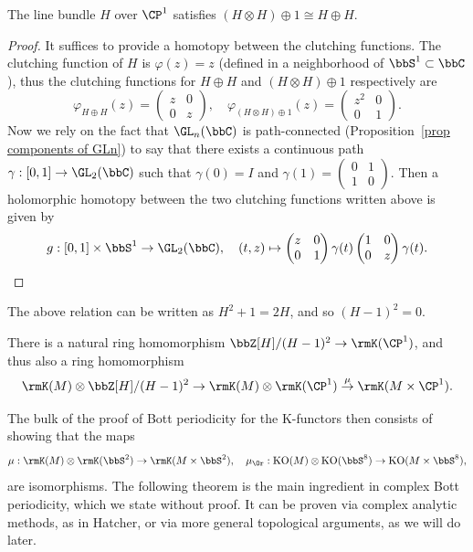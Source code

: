 \begin{prop}
    The line bundle $H$ over $\CP^1$ satisfies $(H\otimes H)\oplus 1\cong H\oplus H$.
\end{prop}
\begin{proof}
    It suffices to provide a homotopy between the clutching functions. The clutching function of $H$ is $\varphi(z)=z$ (defined in a neighborhood of $\bbS^1\subset \bbC$), thus the clutching functions for $H\oplus H$  and $(H\otimes H)\oplus 1$ respectively are
    \[\varphi_{H\oplus H}(z)=\begin{pmatrix}
        z&0\\0&z
    \end{pmatrix},\quad \varphi_{(H\otimes H)\oplus 1}(z)=\begin{pmatrix}
        z^2&0\\0&1
    \end{pmatrix}.\]
    Now we rely on the fact that $\GL_n(\bbC)$ is path-connected (Proposition~\ref{prop components of GLn}) to say that there exists a continuous path $\gamma:[0,1]\to \GL_2(\bbC)$ such that $\gamma(0)=I$ and $\gamma(1)=\begin{pmatrix}
        0&1\\1&0
    \end{pmatrix}.$
    Then a holomorphic homotopy between the two clutching functions written above is given by
    \[g:[0,1]\times\bbS^1\to \GL_2(\bbC),\quad (t,z)\mapsto \begin{pmatrix}
        z&0\\0&1
    \end{pmatrix}\gamma(t)
    \begin{pmatrix}
        1&0\\0&z
    \end{pmatrix}\gamma(t).\]
\end{proof}
The above relation can be written as $H^2+1=2H$, and so $(H-1)^2=0$.
\begin{cor}
    There is a natural ring homomorphism $\bbZ[H]\slash (H-1)^2\to \rmK(\CP^1)$, and thus also a ring homomorphism
    \[\rmK(M)\otimes \bbZ[H]\slash (H-1)^2\to \rmK(M)\otimes \rmK(\CP^1)\overset{\mu}{\to}\rmK(M\times \CP^1).\]
\end{cor}

The bulk of the proof of Bott periodicity for the K-functors then consists of showing that the maps 
\[\mu:\rmK(M)\otimes \rmK(\bbS^2)\to \rmK(M\times \bbS^2),\quad \mu_{\Or}:\mathrm{KO}(M)\otimes \mathrm{KO}(\bbS^8)\to \mathrm{KO}(M\times\bbS^8),\]
are isomorphisms. The following theorem is the main ingredient in complex Bott periodicity, which we state without proof. It can be proven via complex analytic methods, as in Hatcher, or via more general topological arguments, as we will do later. %


